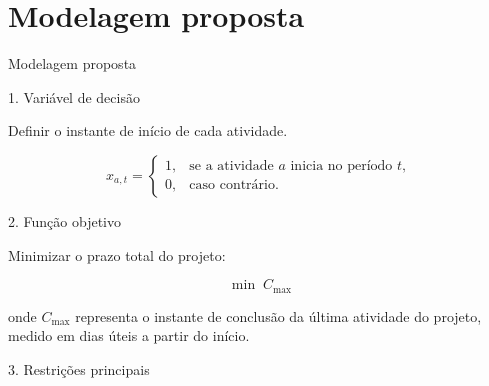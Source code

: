 \documentclass{beamer}
\begin{document}
\section{Modelagem proposta}

\begin{frame}{Modelagem proposta}

\scriptsize

\begin{block}{1. Variável de decisão}

    Definir o instante de início de cada atividade.

    \vspace{-0.15cm}

    \[
    x_{a,t} =
    \begin{cases}
        1, & \text{se a atividade } a \text{ inicia no período } t, \\
        0, & \text{caso contrário.}
    \end{cases}
    \]

    \vspace{-0.2cm}

\end{block}

\vspace{-0.12cm}

\begin{block}{2. Função objetivo}

    Minimizar o prazo total do projeto:

    \vspace{-0.15cm}

    \[
    \min \; C_{\max}
    \]

    \vspace{-0.2cm}

    onde \(C_{\max}\) representa o instante de conclusão da última atividade do projeto, medido em dias úteis a partir do início.

\end{block}

\vspace{-0.12cm}

\begin{block}{3. Restrições principais}


\end{block}
\end{frame}
\end{document}
